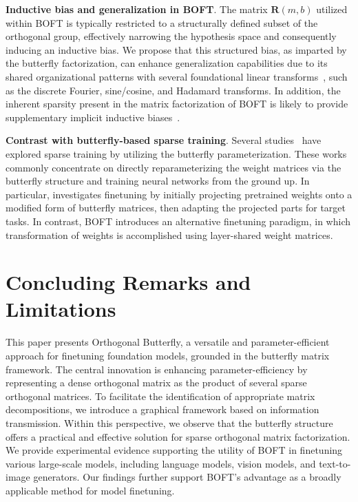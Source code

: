\textbf{Inductive bias and generalization in BOFT}. The matrix $\bm{R}(m,b)$ utilized within BOFT is typically restricted to a structurally defined subset of the orthogonal group, effectively narrowing the hypothesis space and consequently inducing an inductive bias. We propose that this structured bias, as imparted by the butterfly factorization, can enhance generalization capabilities due to its shared organizational patterns with several foundational linear transforms~\cite{dao2019kaleidoscope}, such as the discrete Fourier, sine/cosine, and Hadamard transforms. In addition, the inherent sparsity present in the matrix factorization of BOFT is likely to provide supplementary implicit inductive biases~\cite{gunasekar2017implicit,li2018algorithmic,liu2019neural}.

\textbf{Contrast with butterfly-based sparse training}. Several studies~\cite{dao2019learning,dao2019kaleidoscope,chen2022pixelated,dao2022monarch} have explored sparse training by utilizing the butterfly parameterization. These works commonly concentrate on directly reparameterizing the weight matrices via the butterfly structure and training neural networks from the ground up. In particular, \cite{dao2022monarch} investigates finetuning by initially projecting pretrained weights onto a modified form of butterfly matrices, then adapting the projected parts for target tasks. In contrast, BOFT introduces an alternative finetuning paradigm, in which transformation of weights is accomplished using layer-shared weight matrices.



\section{Concluding Remarks and Limitations}

This paper presents Orthogonal Butterfly, a versatile and parameter-efficient approach for finetuning foundation models, grounded in the butterfly matrix framework. The central innovation is enhancing parameter-efficiency by representing a dense orthogonal matrix as the product of several sparse orthogonal matrices. To facilitate the identification of appropriate matrix decompositions, we introduce a graphical framework based on information transmission. Within this perspective, we observe that the butterfly structure offers a practical and effective solution for sparse orthogonal matrix factorization. We provide experimental evidence supporting the utility of BOFT in finetuning various large-scale models, including language models, vision models, and text-to-image generators. Our findings further support BOFT’s advantage as a broadly applicable method for model finetuning.


